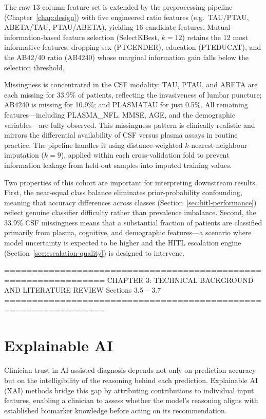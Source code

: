 The raw 13-column feature set is extended by the preprocessing pipeline
(Chapter~\ref{chap:design}) with five engineered ratio features
(e.g.\ TAU/PTAU, ABETA/TAU, PTAU/ABETA), yielding 16 candidate features.
Mutual-information-based feature selection (SelectKBest, $k{=}12$) retains the
12 most informative features, dropping sex (PTGENDER), education (PTEDUCAT),
and the AB42/40 ratio (AB4240) whose marginal information gain falls below the
selection threshold.

Missingness is concentrated in the CSF modality: TAU, PTAU, and ABETA are each
missing for 33.9\% of patients, reflecting the invasiveness of lumbar
puncture; AB4240 is missing for 10.9\%; and PLASMATAU for just 0.5\%. All
remaining features---including PLASMA\_NFL, MMSE, AGE, and the demographic
variables---are fully observed. This missingness pattern is clinically
realistic and mirrors the differential availability of CSF versus plasma
assays in routine practice. The pipeline handles it using distance-weighted
$k$-nearest-neighbour imputation ($k{=}9$), applied within each
cross-validation fold to prevent information leakage from held-out samples
into imputed training values.

Two properties of this cohort are important for interpreting downstream results.
First, the near-equal class balance eliminates prior-probability confounding,
meaning that accuracy differences across classes (Section~\ref{sec:hitl-performance})
reflect genuine classifier difficulty rather than prevalence imbalance.
Second, the 33.9\% CSF missingness means that a substantial fraction of
patients are classified primarily from plasma, cognitive, and demographic
features---a scenario where model uncertainty is expected to be higher and the
HITL escalation engine (Section~\ref{sec:escalation-quality}) is designed to
intervene.


================================================================
  CHAPTER 3: TECHNICAL BACKGROUND AND LITERATURE REVIEW
  Sections 3.5 -- 3.7
================================================================

\section{Explainable AI}
\label{sec:xai}

Clinician trust in AI-assisted diagnosis depends not only on prediction accuracy
but on the intelligibility of the reasoning behind each prediction.
Explainable AI (XAI) methods bridge this gap by attributing contributions to
individual input features, enabling a clinician to assess whether the model's
reasoning aligns with established biomarker knowledge before acting on its
recommendation.

